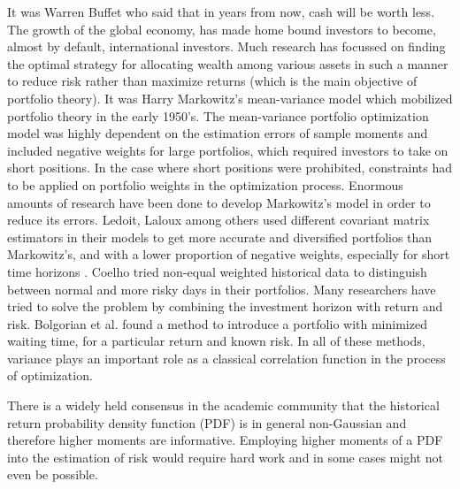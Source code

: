 \documentclass[ aip,jmp,reprint]{revtex4-2}
\begin{document}
It was Warren Buffet who said that in years from now, cash will be
worth less. The growth of the global economy, has made home
bound investors to become, almost by default, international investors. Much
research has focussed on finding the optimal strategy for allocating wealth
among various assets in such a manner to reduce risk rather than maximize
returns (which is the main objective of portfolio theory)\cite{Jorion}. It
was Harry Markowitz's mean-variance model\cite{Mark1,Mark2} which
mobilized portfolio theory in the early 1950's. The mean-variance portfolio
optimization model was highly dependent on the estimation errors of sample
moments and included negative weights for large portfolios, which required
investors to take on short positions. In the case where short positions were
prohibited, constraints had to be applied on portfolio weights in the
optimization process\cite{Best,Green,Jagannathan}. Enormous
amounts of research have been done to develop Markowitz's model in order to
reduce its errors. Ledoit, Laloux among others \cite{Ledoit,Laloux,Plerou,Rosenow,Potters,Anderberg} used different covariant matrix
estimators in their models to get more accurate and diversified portfolios
than Markowitz's, and with a lower proportion of negative weights,
especially for short time horizons \cite{Kondor,Pafka,Kondor2}. Coelho tried non-equal weighted historical data to distinguish
between normal and more risky days in their portfolios\cite{Coelho}. Many
researchers have tried to solve the problem by combining the investment
horizon with return and risk. Bolgorian et al.\cite{Bolgorian} found a
method to introduce a portfolio with minimized waiting time, for a
particular return and known risk. In all of these methods, variance plays an
important role as a classical correlation function in the process of
optimization.

There is a widely held consensus in the academic community that the
historical return probability density function (PDF) is in general
non-Gaussian and therefore higher moments are informative. Employing higher
moments of a PDF into the estimation of risk would require hard work and in
some cases might not even be possible.
\end{document}
